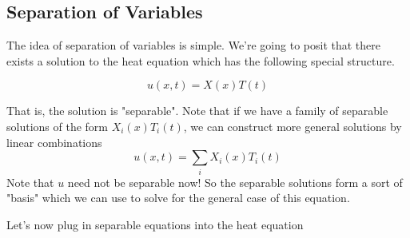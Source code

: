 \documentclass[book.tex]{subfiles}
\begin{document}
\subsection{Separation of Variables}
The idea of separation of variables is simple. We're going to posit that there exists a solution to the heat equation which has the following special structure.

\begin{equation}
    u(x, t) = X(x)T(t)
\end{equation}

That is, the solution is "separable". Note that if we have a family of separable solutions of the form $X_i(x)T_i(t)$, we can construct more general solutions by linear combinations
\begin{equation}
    u(x, t) = \sum_i X_i(x)T_i(t)
\end{equation}
Note that $u$ need not be separable now! So the separable solutions form a sort of "basis" which we can use to solve for the general case of this equation.

Let's now plug in separable equations into the heat equation
\end{document}
